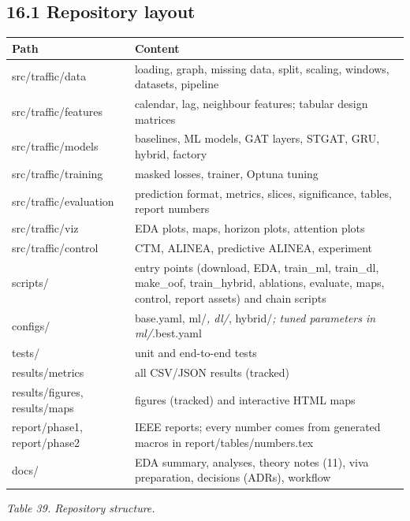 \documentclass[10pt,a4paper]{article}
\begin{document}
\subsection*{16.1 Repository layout}
{\scriptsize\renewcommand{\arraystretch}{1.15}\begin{longtable}{>{\raggedright\arraybackslash}p{0.2800\dimexpr\linewidth-4\tabcolsep\relax}>{\raggedright\arraybackslash}p{0.7200\dimexpr\linewidth-4\tabcolsep\relax}}
\toprule
\textbf{Path} & \textbf{Content} \\
\midrule
\endhead
\bottomrule
\endlastfoot
src/\allowbreak{}traffic/\allowbreak{}data & loading, graph, missing data, split, scaling, windows, datasets, pipeline \\
src/\allowbreak{}traffic/\allowbreak{}features & calendar, lag, neighbour features; tabular design matrices \\
src/\allowbreak{}traffic/\allowbreak{}models & baselines, ML models, GAT layers, STGAT, GRU, hybrid, factory \\
src/\allowbreak{}traffic/\allowbreak{}training & masked losses, trainer, Optuna tuning \\
src/\allowbreak{}traffic/\allowbreak{}evaluation & prediction format, metrics, slices, significance, tables, report numbers \\
src/\allowbreak{}traffic/\allowbreak{}viz & EDA plots, maps, horizon plots, attention plots \\
src/\allowbreak{}traffic/\allowbreak{}control & CTM, ALINEA, predictive ALINEA, experiment \\
scripts/\allowbreak{} & entry points (download, EDA, train\_\allowbreak{}ml, train\_\allowbreak{}dl, make\_\allowbreak{}oof, train\_\allowbreak{}hybrid, ablations, evaluate, maps, control, report assets) and chain scripts \\
configs/\allowbreak{} & base.yaml, ml/\allowbreak{}\emph{, dl/\allowbreak{}}, hybrid/\allowbreak{}\emph{; tuned parameters in ml/\allowbreak{}}.best.yaml \\
tests/\allowbreak{} & unit and end-to-end tests \\
results/\allowbreak{}metrics & all CSV/\allowbreak{}JSON results (tracked) \\
results/\allowbreak{}figures, results/\allowbreak{}maps & figures (tracked) and interactive HTML maps \\
report/\allowbreak{}phase1, report/\allowbreak{}phase2 & IEEE reports; every number comes from generated macros in report/\allowbreak{}tables/\allowbreak{}numbers.tex \\
docs/\allowbreak{} & EDA summary, analyses, theory notes (11), viva preparation, decisions (ADRs), workflow \\
\end{longtable}}
{\footnotesize\itshape Table 39. Repository structure.}\par\medskip
\end{document}
